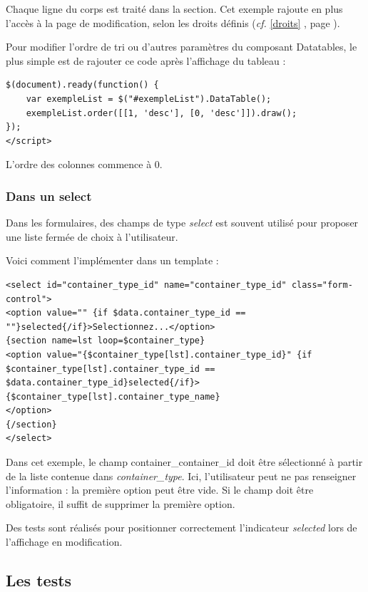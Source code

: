 Chaque ligne du corps est traité dans la section. Cet exemple rajoute en plus l'accès à la page de modification, selon les droits définis (\textit{cf.} \ref{droits} \textit{}, page \pageref{droits}).

Pour modifier l'ordre de tri ou d'autres paramètres du composant Datatables, le plus simple est de rajouter ce code après l'affichage du tableau :

\begin{lstlisting}
$(document).ready(function() {
	var exempleList = $("#exempleList").DataTable();
	exempleList.order([[1, 'desc'], [0, 'desc']]).draw();
});
</script>
\end{lstlisting}

L'ordre des colonnes commence à 0.

\subsubsection{Dans un select}

Dans les formulaires, des champs de type \textit{select} est souvent utilisé pour proposer une liste fermée de choix à l'utilisateur. 

Voici comment l'implémenter dans un template :

\begin{lstlisting}
<select id="container_type_id" name="container_type_id" class="form-control">
<option value="" {if $data.container_type_id == ""}selected{/if}>Selectionnez...</option>
{section name=lst loop=$container_type}
<option value="{$container_type[lst].container_type_id}" {if $container_type[lst].container_type_id == $data.container_type_id}selected{/if}>
{$container_type[lst].container_type_name}
</option>
{/section}
</select>
\end{lstlisting}

Dans cet exemple, le champ container\_container\_id doit être sélectionné à partir de la liste contenue dans \textit{container\_type}. Ici, l'utilisateur peut ne pas renseigner l'information : la première option peut être vide. Si le champ doit être obligatoire, il suffit de supprimer la première option.

Des tests sont réalisés pour positionner correctement l'indicateur \textit{selected} lors de l'affichage en modification.

\subsection{Les tests}

